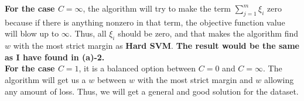 \textbf{For the case $C = \infty$}, the algorithm will try to make the term $\sum_{j=1}^{m}{\xi_{i}}$ zero because if there is anything nonzero in that term, the objective function value will blow up to $\infty$. Thus, all $\xi_{i}$ should be zero, and that makes the algorithm find $w$ with the most strict margin as \textbf{Hard SVM}. \textbf{The result would be the same as I have found in (a)-2.}\\
\textbf{For the case $C = 1$}, it is a balanced option between $C = 0$ and $C = \infty$. The algorithm will get us a $w$ between $w$ with the most strict margin and $w$ allowing any amount of loss. Thus, we will get a general and good solution for the dataset.

  